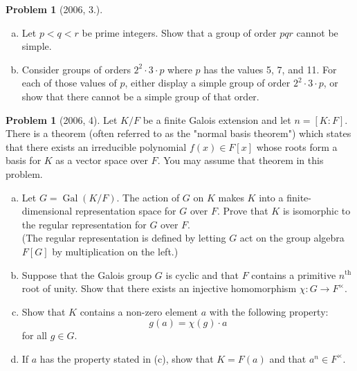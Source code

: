 \documentclass{article}
\newcommand{\<}{\langle} %
\renewcommand{\>}{\rangle} %
\DeclareMathOperator{\Gal}{Gal}
\theoremstyle{plain}
\theoremstyle{remark}
\theoremstyle{definition}
\newtheorem{examproblem}[equation]{Problem}
\begin{document}
\begin{examproblem}[2006, 3.]
	\begin{enumerate}[(a)]
		\item Let $p<q<r$ be prime integers. Show that a group of order
			$pqr$ cannot be simple.
		\item Consider groups of orders $2^2\cdot 3\cdot p$ where $p$
			has the values 5, 7, and 11. For each of those values
			of $p$, either display a simple group of order
			$2^2\cdot 3\cdot p$, or show that there cannot
			be a simple group of that order.
	\end{enumerate}
\end{examproblem}


\begin{examproblem}[2006, 4]
	Let $K/F$ be a finite Galois extension and let $n=[K:F]$. There is a theorem
	(often referred to as the "normal basis theorem") which states that there
	exists an irreducible polynomial $f(x)\in F[x]$ whose
	roots form a basis for $K$ as a vector space over $F$. You may assume
	that theorem in this problem.
	\begin{enumerate}[(a)]
		\item Let $G=\Gal(K/F)$. The action of $G$ on $K$ makes $K$ into
			a finite-dimensional representation space for $G$ over $F$.
			Prove that $K$ is isomorphic to the regular representation
			for $G$ over $F$.\\
			(The regular representation is defined by letting $G$ act
			on the group algebra $F[G]$ by multiplication on
			the left.)
		\item Suppose that the Galois group $G$ is cyclic and that $F$
			contains a primitive $n^{\text{th}}$ root of unity. Show that
			there exists an injective homomorphism $\chi:G\rightarrow
			F^{\times}$.
		\item Show that $K$ contains a non-zero element $a$ with the
			following property:
			$$
			g(a)=\chi(g)\cdot a
			$$
			for all $g\in G$.
		\item If $a$ has the property stated in (c), show that $K=F(a)$ and
			that $a^n\in F^{\times}$.
	\end{enumerate}
\end{examproblem}
\end{document}
